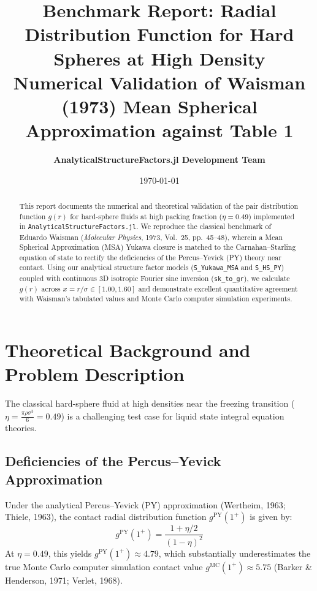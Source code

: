 \documentclass[11pt,a4paper]{article}
\title{\textbf{Benchmark Report: Radial Distribution Function for Hard Spheres at High Density}\\[0.5em]
\large Numerical Validation of Waisman (1973) Mean Spherical Approximation against Table 1}
\author{\textbf{AnalyticalStructureFactors.jl Development Team}}
\date{\today}
\begin{document}
\maketitle

\begin{abstract}
This report documents the numerical and theoretical validation of the pair distribution function $g(r)$ for hard-sphere fluids at high packing fraction ($\eta = 0.49$) implemented in \texttt{AnalyticalStructureFactors.jl}. We reproduce the classical benchmark of Eduardo Waisman (\textit{Molecular Physics}, 1973, Vol.~25, pp.~45--48), wherein a Mean Spherical Approximation (MSA) Yukawa closure is matched to the Carnahan--Starling equation of state to rectify the deficiencies of the Percus--Yevick (PY) theory near contact. Using our analytical structure factor models (\texttt{S\_Yukawa\_MSA} and \texttt{S\_HS\_PY}) coupled with continuous 3D isotropic Fourier sine inversion (\texttt{sk\_to\_gr}), we calculate $g(r)$ across $x = r/\sigma \in [1.00, 1.60]$ and demonstrate excellent quantitative agreement with Waisman's tabulated values and Monte Carlo computer simulation experiments.
\end{abstract}

\section{Theoretical Background and Problem Description}

The classical hard-sphere fluid at high densities near the freezing transition ($\eta = \frac{\pi \rho \sigma^3}{6} = 0.49$) is a challenging test case for liquid state integral equation theories.

\subsection{Deficiencies of the Percus--Yevick Approximation}
Under the analytical Percus--Yevick (PY) approximation (Wertheim, 1963; Thiele, 1963), the contact radial distribution function $g^{\text{PY}}(1^+)$ is given by:
\begin{equation}
    g^{\text{PY}}(1^+) = \frac{1 + \eta/2}{(1 - \eta)^2}
\end{equation}
At $\eta = 0.49$, this yields $g^{\text{PY}}(1^+) \approx 4.79$, which substantially underestimates the true Monte Carlo computer simulation contact value $g^{\text{MC}}(1^+) \approx 5.75$ (Barker \& Henderson, 1971; Verlet, 1968).
\end{document}
